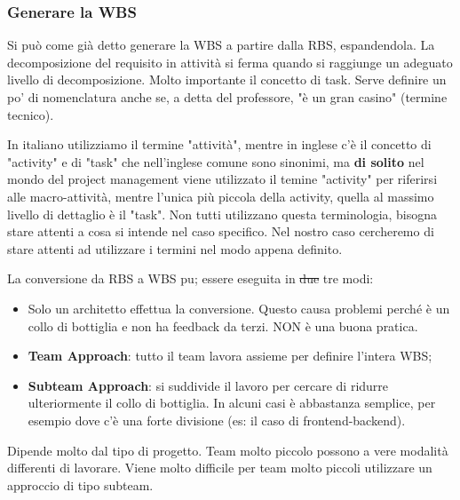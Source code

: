 \subsubsection{Generare la WBS}
Si può come già detto generare la WBS a partire dalla RBS, espandendola. La decomposizione del requisito in attività si ferma quando si raggiunge un adeguato livello di decomposizione.
Molto importante il concetto di task. Serve definire un po' di nomenclatura anche se, a detta del professore, "è un gran casino" (termine tecnico).\newline
\begin{warn}[Terminologia]
	In italiano utilizziamo il termine "attività", mentre in inglese c'è il concetto di "activity" e di "task" che nell'inglese comune sono sinonimi, ma \textbf{di solito} nel mondo del project management viene utilizzato il temine "activity" per riferirsi alle macro-attività, mentre l'unica più piccola della activity, quella al massimo livello di dettaglio è il "task". Non tutti utilizzano questa terminologia, bisogna stare attenti a cosa si intende nel caso specifico. Nel nostro caso cercheremo di stare attenti ad utilizzare i termini nel modo appena definito.
\end{warn}
La conversione da RBS a WBS pu; essere eseguita in \st{due} tre modi:
\begin{itemize}
	\item Solo un architetto effettua la conversione. Questo causa problemi perché è un collo di bottiglia e non ha feedback da terzi. NON è una buona pratica.
	\item \textbf{Team Approach}: tutto il team lavora assieme per definire l'intera WBS;
	\item \textbf{Subteam Approach}: si suddivide il lavoro per cercare di ridurre ulteriormente il collo di bottiglia. In alcuni casi è abbastanza semplice, per esempio dove c'è una forte divisione (es: il caso di frontend-backend).
\end{itemize}
\begin{question}
	Dipende molto dal tipo di progetto. Team molto piccolo possono a vere modalità differenti di lavorare. Viene molto difficile per team molto piccoli utilizzare un approccio di tipo subteam.
\end{question}
